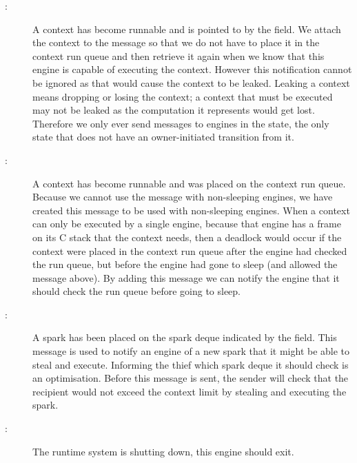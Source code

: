 \begin{description}

    \item[:]
    A context has become runnable and is pointed to by the
    \esactiondata field.
    We attach the context to the message so that we do not have to place it
    in the context run queue and then retrieve it again when we know that
    this engine is capable of executing the context.
    However this notification cannot be ignored as that would cause the
    context to be leaked.
    Leaking a context means dropping or losing the context;
    a context that must be executed may not be leaked as the computation it
    represents would get lost.
    Therefore we only ever send  messages to engines in
    the  state,
    the only state that does not have an owner-initiated transition from
    it.

    \item[:]
    A context has become runnable and was placed on the context run queue.
    Because we cannot use the  message with
    non-sleeping engines,
    we have created this message to be used with non-sleeping engines.
    When a context can only be executed by a single engine,
    because that engine has a frame on its C stack that the context needs,
    then a deadlock would occur if the context were placed in the context run
    queue after the engine had checked the run queue,
    but before the engine had gone to sleep (and allowed the message above).
    By adding this message we can notify the engine that it should check the
    run queue before going to sleep.

    \item[:]
    A spark has been placed on the spark deque indicated by the
    \esactiondata field.
    This message is used to notify an engine of a new spark that it might be
    able to steal and execute.
    Informing the thief which spark deque it should check is an
    optimisation.
    Before this message is sent, the sender will check that the recipient
    would not exceed the context limit by stealing and executing the spark.

    \item[:]
    The runtime system is shutting down, this engine should exit.

\end{description}

